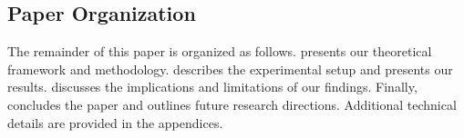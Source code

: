 \subsection{Paper Organization}

The remainder of this paper is organized as follows.  presents our theoretical framework and methodology.  describes the experimental setup and presents our results.  discusses the implications and limitations of our findings. Finally,  concludes the paper and outlines future research directions. Additional technical details are provided in the appendices.
